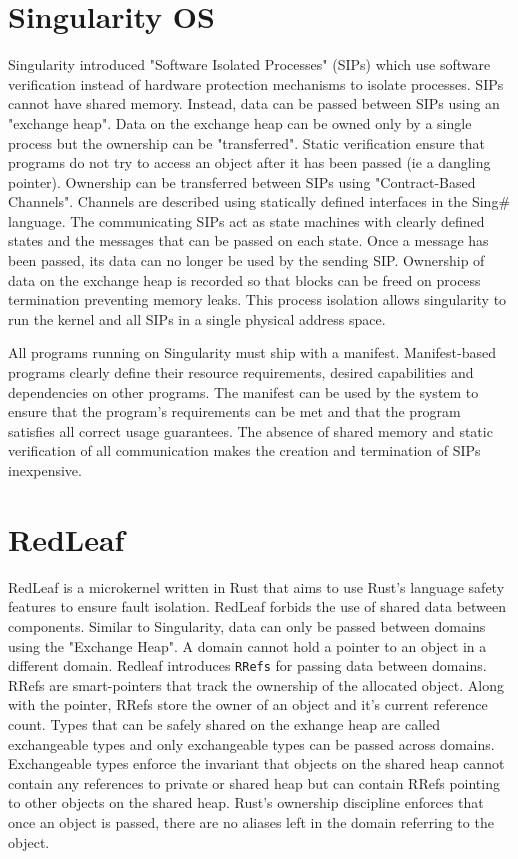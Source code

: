 \section{Singularity OS}
Singularity\cite{singularity} introduced "Software Isolated Processes" (SIPs) which use software verification instead of hardware protection mechanisms to isolate processes. SIPs cannot have shared memory. Instead, data can be passed between SIPs using an "exchange heap". Data on the exchange heap can be owned only by a single process but the ownership can be "transferred". Static verification ensure that programs do not try to access an object after it has been passed (ie a dangling pointer). Ownership can be transferred between SIPs using "Contract-Based Channels". Channels are described using statically defined interfaces in the Sing\# language. The communicating SIPs act as state machines with clearly defined states and the messages that can be passed on each state. Once a message has been passed, its data can no longer be used by the sending SIP. Ownership of data on the exchange heap is recorded so that blocks can be freed on process termination preventing memory leaks. This process isolation allows singularity to run the kernel and all SIPs in a single physical address space.

All programs running on Singularity must ship with a manifest. Manifest-based programs clearly define their resource requirements, desired capabilities and dependencies on other programs. The manifest can be used by the system to ensure that the program's requirements can be met and that the program satisfies all correct usage guarantees. The absence of shared memory and static verification of all communication makes the creation and termination of SIPs inexpensive.

\section{RedLeaf}
RedLeaf\cite{redleaf} is a microkernel written in Rust that aims to use Rust's language safety features to ensure fault isolation. RedLeaf forbids the use of shared data between components. Similar to Singularity, data can only be passed between domains using the "Exchange Heap". A domain cannot hold a pointer to an object in a different domain. Redleaf introduces \lstinline{RRefs} for passing data between domains. RRefs are smart-pointers that track the ownership of the allocated object. Along with the pointer, RRefs store the owner of an object and it's current reference count. Types that can be safely shared on the exhange heap are called exchangeable types and only exchangeable types can be passed across domains. Exchangeable types enforce the invariant that objects on the shared heap cannot contain any references to private or shared heap but can contain RRefs pointing to other objects on the shared heap. Rust's ownership discipline enforces that once an object is passed, there are no aliases left in the domain referring to the object. 

